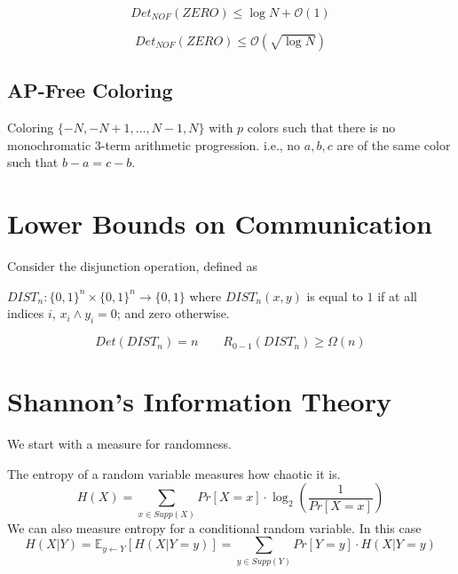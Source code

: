 \begin{proposition}
	\begin{equation}
		Det_{NOF}(ZERO) \leq \log N + \mathcal O (1)
	\end{equation}
\end{proposition}

\begin{theorem}
	\begin{equation}
		Det_{NOF}(ZERO) \leq \mathcal O \left( \sqrt{ \log N } \right) 
	\end{equation}
\end{theorem}

\subsection{AP-Free Coloring}
\begin{definition}
	Coloring $\{ -N, -N + 1, \dots, N - 1, N\}$ with $p$ colors such that there is no monochromatic 3-term arithmetic progression. i.e., no $a, b, c$ are of the same color such that $b - a = c - b$. 
\end{definition}






\section{Lower Bounds on Communication}
Consider the disjunction operation, defined as 
\begin{definition}
	$DIST_n: \{ 0, 1\}^ n \times \{ 0 , 1\}^n \rightarrow \{ 0, 1\}$ where $DIST_n (x, y)$ is equal to $1$ if at all indices $i$, $x_i \land y_i = 0$; and zero otherwise.  
\end{definition}

\begin{theorem}
	\label{thm: lowerbound on communication}
	\begin{equation}
		Det(DIST_n) = n \quad \quad R_{0 - 1}(DIST_n) \geq \Omega(n) 
	\end{equation}
\end{theorem}

\section{Shannon's Information Theory}
We start with a measure for randomness. 
\begin{definition}
	The entropy of a random variable measures how chaotic it is. 
	\begin{equation}
		H(X) = \sum_{x \in Supp(X)} Pr[X = x] \cdot \log_2 \left( \frac{1}{Pr [X = x]} \right)
	\end{equation}
	We can also measure entropy for a conditional random variable. In this case
	\begin{equation}
		H(X|Y) = \mathbb E_{y \gets Y} [H(X | Y = y)] = \sum_{y \in Supp(Y)} Pr[Y = y] \cdot H (X | Y = y)
	\end{equation}
\end{definition}

